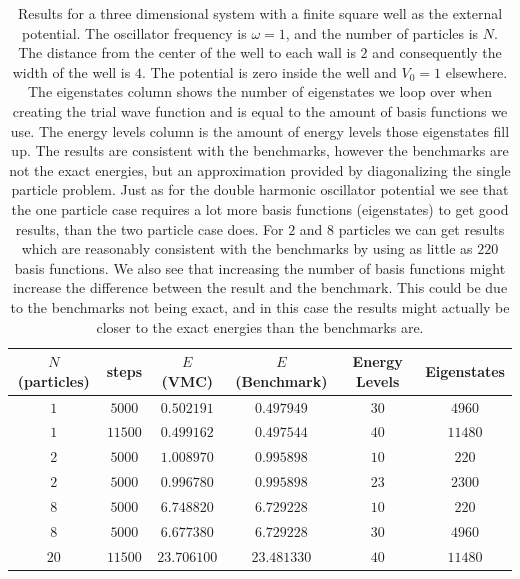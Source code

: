 \documentclass[../main.tex]{subfiles}
\begin{document}
\begin{table}[!ht]
  \centering
  \begin{tabular}{ | c | c | c | c | c | c | }
    \hline
    $N$ (particles) & steps & $E$ (VMC) & $E$ (Benchmark) &  Energy Levels & Eigenstates\\*
    \hline
    $1$ & $5000$ & $0.502191$ & $0.497949$ & $30$ & $4960$ \\*
    \hline
    $1$ & $11500$ & $0.499162$ & $0.497544$ & $40$ & $11480$ \\*
    \hline
    $2$ & $5000$ & $1.008970$ & $0.995898$ & $10$ & $220$ \\*
    \hline
    $2$ & $5000$ & $0.996780$ & $0.995898$ & $23$ & $2300$ \\*
    \hline
    $8$ & $5000$ & $6.748820$ & $6.729228$ & $10$ & $220$ \\*
    \hline
    $8$ & $5000$ & $6.677380$ & $6.729228$ & $30$ & $4960$ \\*
    \hline
    $20$ & $11500$ & $23.706100$ & $23.481330$ & $40$ & $11480$ \\*
    \hline
  \end{tabular}
  \caption{Results for a three dimensional system with a finite square well as the external potential. The oscillator frequency is $\omega = 1$, and the number of particles is $N$. The distance from the center of the well to each wall is $2$ and consequently the width of the well is $4$. The potential is zero inside the well and $V_0 = 1$ elsewhere. The eigenstates column shows the number of eigenstates we loop over when creating the trial wave function and is equal to the amount of basis functions we use. The energy levels column is the amount of energy levels those eigenstates fill up. The results are consistent with the benchmarks, however the benchmarks are not the exact energies, but an approximation provided by diagonalizing the single particle problem. Just as for the double harmonic oscillator potential we see that the one particle case requires a lot more basis functions (eigenstates) to get good results, than the two particle case does. For $2$ and $8$ particles we can get results which are reasonably consistent with the benchmarks by using as little as $220$ basis functions. We also see that increasing the number of basis functions might increase the difference between the result and the benchmark. This could be due to the benchmarks not being exact, and in this case the results might actually be closer to the exact energies than the benchmarks are.}
  \label{tab:SquareWellTest3D}
\end{table}
\end{document}
